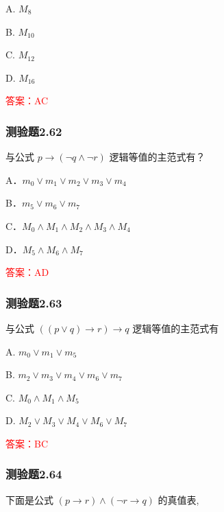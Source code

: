 \documentclass[UTF8, heading=true]{ctexart}
\begin{document}
A. $ M_8$

B. $M_{10}$

C. $ M_{12}$

D. $ M_{16}$

\textcolor{red}{答案：AC}

\subsubsection{测验题2.62}

与公式 $p \rightarrow(\neg q \wedge \neg r)$ 逻辑等值的主范式有？

A．$
m_0 \vee m_1 \vee m_2 \vee m_3 \vee m_4
$


B．$
m_5 \vee m_6 \vee m_7
$


C．$
M_0 \wedge M_1 \wedge M_2 \wedge M_3 \wedge M_4
$


D．$
M_5 \wedge M_6 \wedge M_7
$

\textcolor{red}{答案：AD}


\subsubsection{测验题2.63}

与公式 $((p \vee q) \rightarrow r) \rightarrow q$ 逻辑等值的主范式有 $\qquad$

A. $ m_0 \vee m_1 \vee m_5$

B. $ m_2 \vee m_3 \vee m_4 \vee m_6 \vee m_7$

C. $ M_0 \wedge M_1 \wedge M_5$

D. $ M_2 \vee M_3 \vee M_4 \vee M_6 \vee M_7$

\textcolor{red}{答案：BC}

\subsubsection{测验题2.64}

下面是公式 $(p \rightarrow r) \wedge(\neg r \rightarrow q)$ 的真值表,
\end{document}
